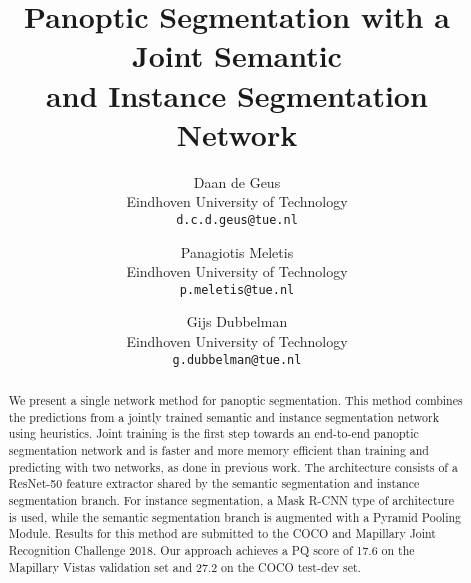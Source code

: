 \documentclass[10pt,twocolumn,letterpaper]{article}
\begin{document}
\title{Panoptic Segmentation with a Joint Semantic \\ and Instance Segmentation Network}

\author{Daan de Geus\\
Eindhoven University of Technology\\
{\tt\small d.c.d.geus@tue.nl}
\and
Panagiotis Meletis\\
Eindhoven University of Technology\\
{\tt\small p.meletis@tue.nl}
\and
Gijs Dubbelman\\
Eindhoven University of Technology\\
{\tt\small g.dubbelman@tue.nl}
}

\maketitle


\begin{abstract}
We present a single network method for panoptic segmentation. This method combines the predictions from a jointly trained semantic and instance segmentation network using heuristics. Joint training is the first step towards an end-to-end panoptic segmentation network and is faster and more memory efficient than training and predicting with two networks, as done in previous work. The architecture consists of a ResNet-50 feature extractor shared by the semantic segmentation and instance segmentation branch. For instance segmentation, a Mask R-CNN type of architecture is used, while the semantic segmentation branch is augmented with a Pyramid Pooling Module. Results for this method are submitted to the COCO and Mapillary Joint Recognition Challenge 2018. Our approach achieves a PQ score of 17.6 on the Mapillary Vistas validation set and 27.2 on the COCO test-dev set.
\end{abstract}
\end{document}
